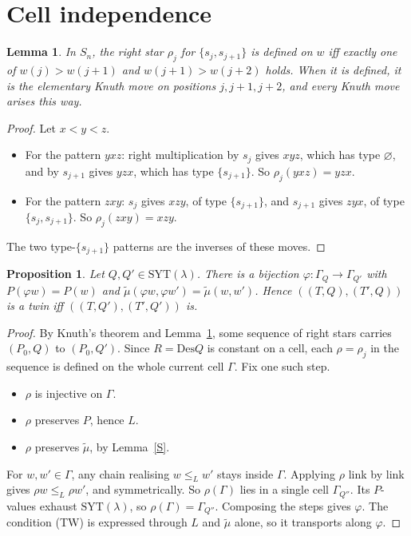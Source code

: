 \documentclass[11pt]{amsart}
\newcommand{\Des}{\mathrm{Des}}
\newcommand{\tmu}{\tilde\mu}
\theoremstyle{plain}
\newtheorem{proposition}[theorem]{Proposition}
\newtheorem{lemma}[theorem]{Lemma}
\theoremstyle{definition}
\begin{document}
\section{Cell independence}

\begin{lemma}\label{lem:K}
In $S_n$, the right star $\rho_j$ for $\{s_j,s_{j+1}\}$ is defined on $w$ iff exactly one of $w(j)>w(j+1)$ and $w(j+1)>w(j+2)$ holds. When it is defined, it is the elementary Knuth move on positions $j,j+1,j+2$, and every Knuth move arises this way.
\end{lemma}
\begin{proof}
Let $x<y<z$.
\begin{itemize}[leftmargin=*,itemsep=0pt]
\item For the pattern $yxz$: right multiplication by $s_j$ gives $xyz$, which has type $\varnothing$, and by $s_{j+1}$ gives $yzx$, which has type $\{s_{j+1}\}$. So $\rho_j(yxz)=yzx$.
\item For the pattern $zxy$: $s_j$ gives $xzy$, of type $\{s_{j+1}\}$, and $s_{j+1}$ gives $zyx$, of type $\{s_j,s_{j+1}\}$. So $\rho_j(zxy)=xzy$.
\end{itemize}
The two type-$\{s_{j+1}\}$ patterns are the inverses of these moves.
\end{proof}

\begin{proposition}\label{prop:Q}
Let $Q,Q'\in\mathrm{SYT}(\lambda)$. There is a bijection $\varphi:\Gamma_Q\to\Gamma_{Q'}$ with $P(\varphi w)=P(w)$ and $\tmu(\varphi w,\varphi w')=\tmu(w,w')$. Hence $((T,Q),(T',Q))$ is a twin iff $((T,Q'),(T',Q'))$ is.
\end{proposition}
\begin{proof}
By Knuth's theorem and Lemma~\ref{lem:K}, some sequence of right stars carries $(P_0,Q)$ to $(P_0,Q')$. Since $R=\Des Q$ is constant on a cell, each $\rho=\rho_j$ in the sequence is defined on the whole current cell $\Gamma$. Fix one such step.
\begin{itemize}[leftmargin=*,itemsep=0pt]
\item $\rho$ is injective on $\Gamma$.
\item $\rho$ preserves $P$, hence $L$.
\item $\rho$ preserves $\tmu$, by Lemma~\ref{S}.
\end{itemize}
For $w,w'\in\Gamma$, any chain realising $w\le_L w'$ stays inside $\Gamma$. Applying $\rho$ link by link gives $\rho w\le_L\rho w'$, and symmetrically. So $\rho(\Gamma)$ lies in a single cell $\Gamma_{Q''}$. Its $P$-values exhaust $\mathrm{SYT}(\lambda)$, so $\rho(\Gamma)=\Gamma_{Q''}$. Composing the steps gives $\varphi$. The condition (TW) is expressed through $L$ and $\tmu$ alone, so it transports along $\varphi$.
\end{proof}
\end{document}
